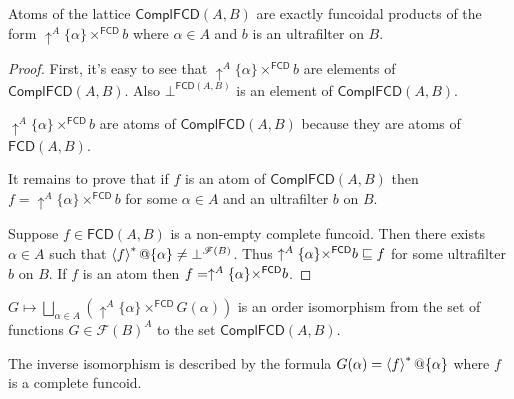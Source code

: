 \begin{thm}
Atoms of the lattice $\mathsf{ComplFCD}(A,B)$ are exactly funcoidal
products of the form $\uparrow^{A}\{\alpha\}\times^{\mathsf{FCD}}b$
where $\alpha\in A$ and $b$ is an ultrafilter on $B$.\end{thm}
\begin{proof}
First, it's easy to see that $\uparrow^{A}\{\alpha\}\times^{\mathsf{FCD}}b$
are elements of $\mathsf{ComplFCD}(A,B)$. Also $\bot^{\mathsf{FCD}(A,B)}$
is an element of $\mathsf{ComplFCD}(A,B)$.

$\uparrow^{A}\{\alpha\}\times^{\mathsf{FCD}}b$ are atoms of
$\mathsf{ComplFCD}(A,B)$
because they are atoms of $\mathsf{FCD}(A,B)$.

It remains to prove that if $f$ is an atom of $\mathsf{ComplFCD}(A,B)$
then $f=\uparrow^{A}\{\alpha\}\times^{\mathsf{FCD}}b$ for some $\alpha\in A$
and an ultrafilter $b$ on $B$.

Suppose $f\in\mathsf{FCD}(A,B)$ is a non-empty complete funcoid.
Then there exists $\alpha\in A$ such that $\left\langle f\right\rangle ^{\ast}@\{\alpha\}\ne\bot^{\mathscr{F}(B)}$.
Thus $\uparrow^{A}\{\alpha\}\text{\texttimes}^{\mathsf{FCD}}b\sqsubseteq f$
for some ultrafilter $b$ on $B$. If $f$ is an atom then
$f=\uparrow^{A}\{\alpha\}\text{\texttimes}^{\mathsf{FCD}}b$.\end{proof}
\begin{thm}
\label{complfcd-rep}$G\mapsto\bigsqcup_{\alpha\in
A}(\uparrow^{A}\{\alpha\}\times^{\mathsf{FCD}}G(\alpha))$
is an order isomorphism from the set of functions $G\in\mathscr{F}(B)^{A}$
to the set $\mathsf{ComplFCD}(A,B)$.

The inverse isomorphism is described by the formula $G(\alpha)=\left\langle f\right\rangle ^{\ast}@\{\alpha\}$
where $f$ is a complete funcoid.\end{thm}
